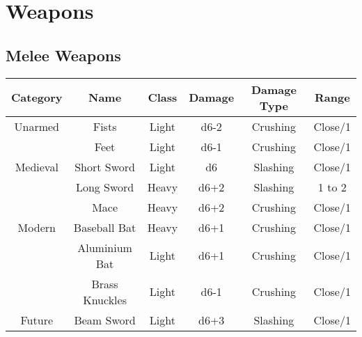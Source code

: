 
\section{Weapons} \label{sec:weapons}
\subsection{Melee Weapons}
\begin{center}
\begin{tabular}{c|c|c|c|c|c}
    \textbf{Category} & \textbf{Name} & \textbf{Class} & \textbf{Damage} & \textbf{Damage Type} & \textbf{Range} \\\hline
    Unarmed  & Fists          & Light & d6-2 & Crushing & Close/1\\
             & Feet           & Light & d6-1 & Crushing & Close/1\\\hline
    Medieval & Short Sword    & Light & d6   & Slashing & Close/1\\
             & Long Sword     & Heavy & d6+2 & Slashing & 1 to 2 \\
             & Mace           & Heavy & d6+2 & Crushing & Close/1\\\hline
    Modern   & Baseball Bat   & Heavy & d6+1 & Crushing & Close/1\\
             & Aluminium Bat  & Light & d6+1 & Crushing & Close/1\\
             & Brass Knuckles & Light & d6-1 & Crushing & Close/1\\\hline
    Future   & Beam Sword     & Light & d6+3 & Slashing & Close/1
\end{tabular}
\end{center}

